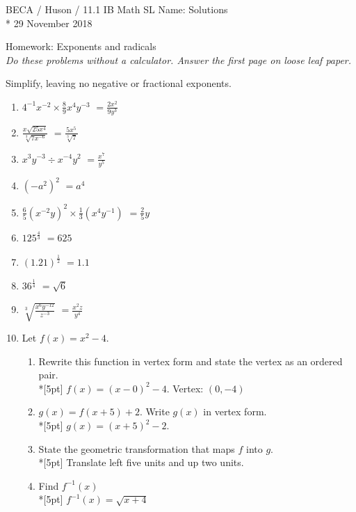 \documentclass[]{book}
\begin{document}
\noindent BECA / Huson / 11.1 IB Math SL \hspace{2in} Name: \large{Solutions}\\*
29 November 2018
\begin{center}
{\Large Homework: Exponents and radicals}\\
\textit{Do these problems without a calculator. Answer the first page on loose leaf paper.}
\end{center}



Simplify, leaving no negative or fractional exponents.

\begin{enumerate}

\item $\displaystyle 4^{-1}x^{-2} \times \frac{8}{9}x^4 y^{-3}$
    $\displaystyle =\frac{2x^2}{9y^3}$\\[10pt]
\item $\displaystyle  \frac{x \sqrt{25x^4}}{\sqrt[3]{7x^{-6}}}$
    $\displaystyle =\frac{5x^5}{\sqrt[3]{7}}$\\[10pt]
\item $x^3 y^{-3} \div x^{-4} y^2$
    $\displaystyle =\frac{x^7}{y^5}$\\[10pt]
\item $(-a^2)^2$
    $=a^4$

\item $\displaystyle \frac{6}{5} (x^{-2} y)^2 \times \frac{1}{3}(x^4 y^{-1})$
    $\displaystyle =\frac{2}{5}y$\\[10pt]

\item $\displaystyle  125^\frac{4}{3}$
    $=625$
\item $\displaystyle  (1.21)^{\frac{1}{2}}$
    $=1.1$

\item $\displaystyle  36^\frac{1}{4}$
    $= \sqrt{6}$
\item $\displaystyle  \sqrt[3]{\frac{x^6 y^{-12}}{z^{-3}}}$
    $\displaystyle = \frac{x^2 z}{y^4}$\\[10pt]

\item Let $f(x) = x^2 - 4$.
\begin{enumerate}
    \item Rewrite this function in vertex form and state the vertex as an ordered pair.\\*[5pt]
        $f(x)=(x-0)^2-4$. Vertex: $(0,-4)$
    \item $g(x)=f(x+5)+2$. Write $g(x)$ in vertex form.\\*[5pt]
        $g(x)=(x+5)^2-2$.
    \item State the geometric transformation that maps $f$ into $g$.\\*[5pt]
        Translate left five units and up two units.
    \item Find $f^{-1}(x)$\\*[5pt]
        $f^{-1}(x)=\sqrt{x+4}$
\end{enumerate}


\end{enumerate}
\end{document}
